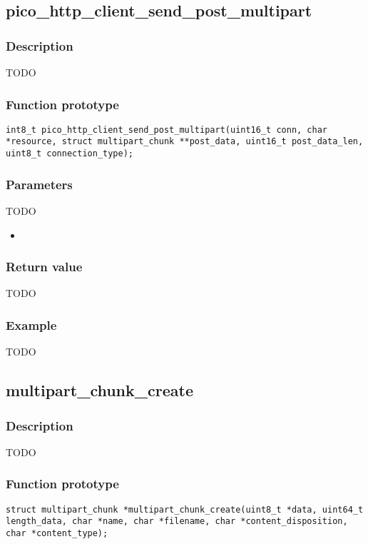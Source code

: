 \subsection{pico\_http\_client\_send\_post\_multipart}

\subsubsection*{Description}
TODO

\subsubsection*{Function prototype}
\texttt{int8\_t pico\_http\_client\_send\_post\_multipart(uint16\_t conn, char *resource, struct multipart\_chunk **post\_data, uint16\_t post\_data\_len, uint8\_t connection\_type);}

\subsubsection*{Parameters}
TODO
\begin{itemize}[noitemsep]
\item \texttt{}
\end{itemize}
\subsubsection*{Return value}
TODO
\subsubsection*{Example}
TODO


\subsection{multipart\_chunk\_create}

\subsubsection*{Description}
TODO

\subsubsection*{Function prototype}
\texttt{struct multipart\_chunk *multipart\_chunk\_create(uint8\_t *data, uint64\_t length\_data, char *name, char *filename, char *content\_disposition, char *content\_type);}


